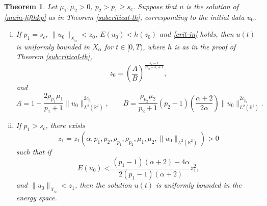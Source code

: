 \documentclass[10pt]{article}
\numberwithin{equation}{section}
\newtheorem{theorem}{\quad Theorem}[section]
\newcommand{\lt}{{L^2(\mathbb{R}^2)}}
\newcommand{\x}{{X_\alpha}}
\newcommand{\xx}{{\dot{X}_\alpha}}
\newcommand{\mo}{\mu_1}  \newcommand{\po}{{p_1}}
\newcommand{\moo}{\mu_2}  \newcommand{\poo}{{p_2}}
\newcommand{\al}{\alpha}
\begin{document}
	
	\begin{theorem}\label{supercritical-th}
		Let $\mo,\moo>0$, $\poo>\po\geq s_c$. Suppose that $u$ is the solution of \eqref{main-fifthkp} as in Theorem \ref{subcritical-th}, corresponding to the initial data $u_0$.
		\begin{enumerate}[(i)]
			\item If $\po=s_c$,   $\|u_0\|_\xx<z_0$, $E(u_0)<h(z_0)$ and \eqref{crit-in} holds, then $u(t)$ is uniformly bounded in $\x$ 	for $t\in [0, T )$, 
			where $h$ is as in the proof of Theorem \ref{subcritical-th},
			\[
			z_0=\left(\frac{A}{B}\right)^{\frac{s_c-1}{2p_2-s_c+1}},
			\]
			and
			\[
			A=1-\frac{2\rho_{p_1}\mo}{\po+1}\|u_0\|_\lt^{2c_{\po}},\qquad
			B=\frac{\rho_{p_2}\moo}{\poo+1}(\poo-1)\left(\frac{\al+2}{2\al}\right)\|u_0\|_\lt^{2c_{\poo}}.
			\]
			\item  If $\po>s_c$,
			there exists 
			\[
			z_1=z_1\left(\al,p_1,p_2,\rho_{p_1},\rho_{p_2},\mu_1,\mu_2,\|u_0\|_\lt\right)>0
			\]
			such that if $$E(u_0)< \frac{(p_1-1)(\al+2)-4\al}{2(p_1-1)(\al+2)}z_1^2,$$ and $\|u_0\|_\xx<z_1$, then the solution $u(t)$ is uniformly bounded in the energy space.
		\end{enumerate} 
	\end{theorem}
	
\end{document}
